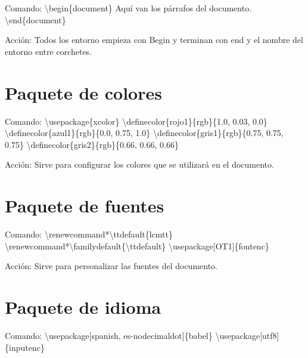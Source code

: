 \documentclass[a4paper,11pt]{article}
\begin{document}
\begin{flushleft}
		Comando: \textbackslash begin\{document\}\newline
		Aquí van los párrafos del documento.\newline
		\textbackslash end\{document\}\newline
			
		Acción: Todos los entorno empieza con Begin y terminan con end y el nombre del entorno entre corchetes.\newline
		
		\section{Paquete de colores}
		
		Comando: \textbackslash usepackage\{xcolor\}\newline
		\textbackslash definecolor\{rojo1\}\{rgb\}\{1.0, 0.03, 0.0\}\newline
		\textbackslash definecolor\{azul1\}\{rgb\}\{0.0, 0.75, 1.0\}\newline
		\textbackslash definecolor\{gris1\}\{rgb\}\{0.75, 0.75, 0.75\}\newline
		\textbackslash definecolor\{gris2\}\{rgb\}\{0.66, 0.66, 0.66\}\newline
			
		Acción: Sirve para configurar los colores que se utilizará en el documento.\newline
		
		\section{Paquete de fuentes}
			
		Comando: \textbackslash renewcommand*\textbackslash ttdefault\{lcmtt\}\newline
		\textbackslash renewcommand*\textbackslash familydefault\{\textbackslash ttdefault\}\newline
		\textbackslash usepackage[OT1]\{fontenc\}\newline
			
		Acción: Sirve para personalizar las fuentes del documento.\newline
		
		\section{Paquete de idioma}
			
		Comando: \textbackslash usepackage[spanish, es-nodecimaldot]\{babel\}\newline
		\textbackslash usepackage[utf8]\{inputenc\}\newline
			

\end{flushleft}
\end{document}
